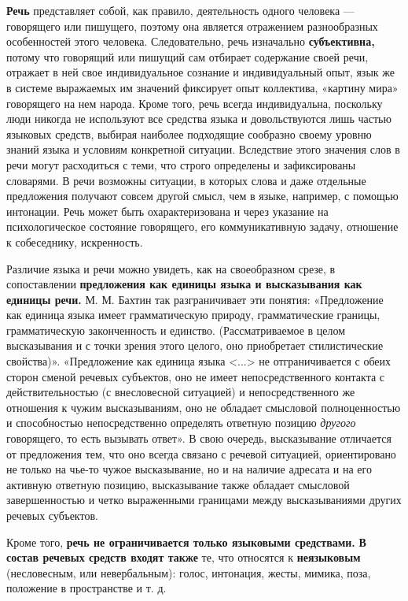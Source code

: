 \textbf{Речь} представляет собой, как правило, деятельность одного человека --- говорящего или пишущего, поэтому она является отражением разнообразных особенностей этого человека.
Следовательно, речь изначально \textbf{субъективна,} потому что говорящий или пишущий сам отбирает содержание своей речи, отражает в ней свое индивидуальное сознание и индивидуальный опыт, язык же в системе выражаемых им значений фиксирует опыт коллектива, «картину мира» говорящего на нем народа.
Кроме того, речь всегда индивидуальна, поскольку люди никогда не используют все средства языка и довольствуются лишь частью языковых средств, выбирая наиболее подходящие сообразно своему уровню знаний языка и условиям конкретной ситуации.
Вследствие этого значения слов в речи могут расходиться с теми, что строго определены и зафиксированы словарями.
В речи возможны ситуации, в которых слова и даже отдельные предложения получают совсем другой смысл, чем в языке, например, с помощью интонации.
Речь может быть охарактеризована и через указание на психологическое состояние говорящего, его коммуникативную задачу, отношение к собеседнику, искренность.

Различие языка и речи можно увидеть, как на своеобразном срезе, в сопоставлении \textbf{предложения как единицы языка и высказывания как единицы речи.}
М. М. Бахтин так разграничивает эти понятия: «Предложение как единица языка имеет грамматическую природу, грамматические границы, грамматическую законченность и единство.
(Рассматриваемое в целом высказывания и с точки зрения этого целого, оно приобретает стилистические свойства)».
«Предложение как единица языка <...> не отграничивается с обеих сторон сменой речевых субъектов, оно не имеет непосредственного контакта с действительностью (с внесловесной ситуацией) и непосредственного же отношения к чужим высказываниям, оно не обладает смысловой полноценностью и способностью непосредственно определять ответную позицию \textit{другого} говорящего, то есть вызывать ответ».
В свою очередь, высказывание отличается от предложения тем, что оно всегда связано с речевой ситуацией, ориентировано не только на чье-то чужое высказывание, но и на наличие адресата и на его активную ответную позицию, высказывание также обладает смысловой завершенностью и четко выраженными границами между высказываниями других речевых субъектов.

Кроме того, \textbf{речь не ограничивается только языковыми средствами.}
\textbf{В состав речевых средств входят также} те, что относятся
к \textbf{неязыковым} (несловесным, или невербальным): голос, интонация, жесты, мимика, поза, положение в пространстве и т. д.

